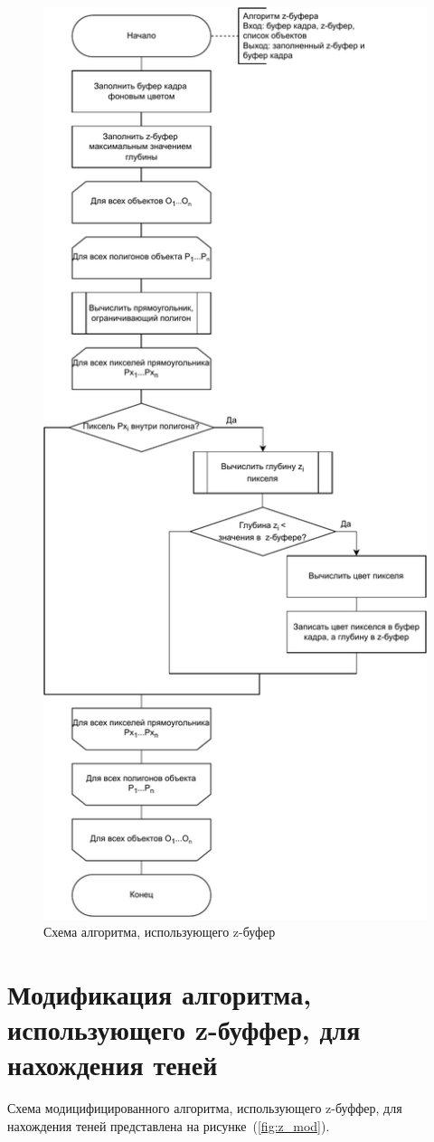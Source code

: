 \begin{figure}[h!]
	\centering
	\includegraphics[width=0.65\linewidth]{img/z}
	\caption{Схема алгоритма, использующего z-буфер}
	\label{fig:z}
\end{figure}
\clearpage

\section{Модификация алгоритма, использующего z-буффер, для нахождения теней}

Схема модицифицированного алгоритма, использующего z-буффер, для нахождения теней представлена на рисунке~(\ref{fig:z_mod}).

